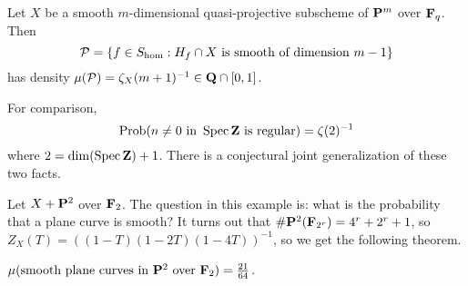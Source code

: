 \begin{theorem}
Let $X$ be a smooth $m$-dimensional quasi-projective subscheme of 
$\mathbf{P}^m$ over $\mathbf{F}_q$. Then 
\[
  \mathcal{P}=\{f\in S_{\hom}:H_f\cap X\text{ is smooth of dimension $m-1$}\} 
\]
has density $\mu(\mathcal{P}) = \zeta_X(m+1)^{-1}\in \mathbf{Q}\cap [0,1]$. 
\end{theorem}

For comparison, 
\[
  \operatorname{Prob}(n\ne 0\text{ in }\operatorname{Spec}\mathbf{Z}\text{ is regular}) = \zeta(2)^{-1} 
\]
where $2=\dim(\operatorname{Spec}\mathbf{Z})+1$. There is a conjectural joint generalization of 
these two facts. 

\begin{example}
Let $X+\mathbf{P}^2$ over $\mathbf{F}_2$. The question in this example is: what is the 
probability that a plane curve is smooth? It turns out that 
$\#\mathbf{P}^2(\mathbf{F}_{2^r}) = 4^r+2^r+1$, so 
$Z_X(T) = \left((1-T)(1-2 T)(1-4 T)\right)^{-1}$, so we get the following 
theorem. 
\end{example}

\begin{theorem}
$\mu(\text{smooth plane curves in $\mathbf{P}^2$ over $\mathbf{F}_2$}) = \frac{21}{64}$. 
\end{theorem}




